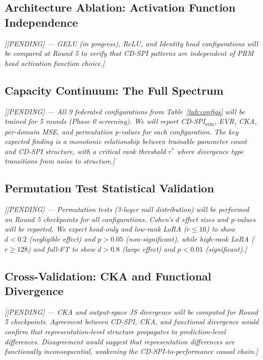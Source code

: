 \documentclass{article}
\begin{document}
\subsection{Architecture Ablation: Activation Function Independence}

\emph{[[PENDING] --- GELU (in progress), ReLU, and Identity head configurations will be compared at Round 5 to verify that CD-SPI patterns are independent of PRM head activation function choice.]}

\subsection{Capacity Continuum: The Full Spectrum}

\emph{[[PENDING] --- All 9 federated configurations from Table~\ref{tab:configs} will be trained for 5 rounds (Phase 0 screening).
We will report CD-SPI$_{\text{sym}}$, EVR, CKA, per-domain MSE, and permutation p-values for each configuration.
The key expected finding is a monotonic relationship between trainable parameter count and CD-SPI structure, with a critical rank threshold $r^*$ where divergence type transitions from noise to structure.]}

\subsection{Permutation Test Statistical Validation}

\emph{[[PENDING] --- Permutation tests (3-layer null distribution) will be performed on Round 5 checkpoints for all configurations.
Cohen's $d$ effect sizes and p-values will be reported.
We expect head-only and low-rank LoRA ($r \leq 16$) to show $d < 0.2$ (negligible effect) and $p > 0.05$ (non-significant), while high-rank LoRA ($r \geq 128$) and full-FT to show $d > 0.8$ (large effect) and $p < 0.01$ (significant).]}

\subsection{Cross-Validation: CKA and Functional Divergence}

\emph{[[PENDING] --- CKA and output-space JS divergence will be computed for Round 5 checkpoints.
Agreement between CD-SPI, CKA, and functional divergence would confirm that representation-level structure propagates to prediction-level differences.
Disagreement would suggest that representation differences are functionally inconsequential, weakening the CD-SPI-to-performance causal chain.]}
\end{document}
